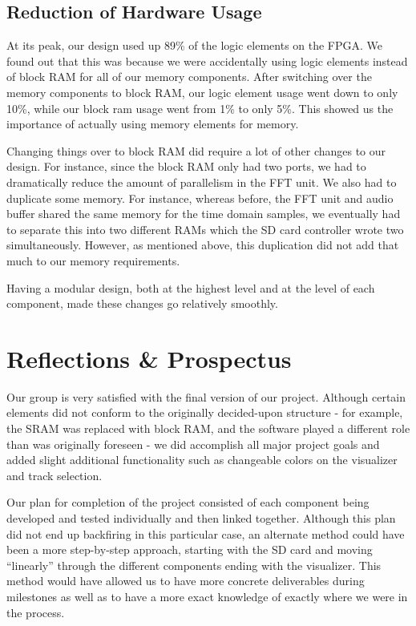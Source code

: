 \documentclass{article}
\begin{document}
\subsection{Reduction of Hardware Usage}

At its peak, our design used up 89\% of the logic elements on the FPGA. 
We found out that this was because we were accidentally using logic elements 
instead of block RAM for all of our memory components. After switching over 
the memory components to block RAM, our logic element usage went down to only 
10\%, while our block ram usage went from 1\% to only 5\%. This showed us the 
importance of actually using memory elements for memory.

Changing things over to block RAM did require a lot of other changes to our 
design. For instance, since the block RAM only had two ports, we had to 
dramatically reduce the amount of parallelism in the FFT unit. We also had to 
duplicate some memory. For instance, whereas before, the FFT unit and audio 
buffer shared the same memory for the time domain samples, we eventually had 
to separate this into two different RAMs which the SD card controller wrote 
two simultaneously. However, as mentioned above, this duplication did not add 
that much to our memory requirements. 

Having a modular design, both at the highest level and at the level of each 
component, made these changes go relatively smoothly.

\section{Reflections \& Prospectus}

Our group is very satisfied with the final version of our project.  
Although certain elements did not conform to the originally decided-upon 
structure - for example, the SRAM was replaced with block RAM, and the software 
played a different role than was originally foreseen - we did accomplish all 
major project goals and added slight additional functionality such as 
changeable colors on the visualizer and track selection.

Our plan for completion of the project consisted of each component being 
developed and tested individually and then linked together. Although this plan 
did not end up backfiring in this particular case, an alternate method could 
have been a more step-by-step approach, starting with the SD card and moving 
“linearly” through the different components ending with the visualizer. This 
method would have allowed us to have more concrete deliverables during 
milestones as well as to have a more exact knowledge of exactly where we were 
in the process.
\end{document}
